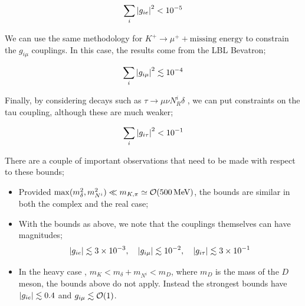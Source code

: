 \documentclass[10pt]{article}
\begin{document}
\begin{framed}
  \begin{equation}
    \sum_{i}{\left| g_{ie} \right|^2} < 10^{-5}
  \end{equation}
\end{framed}
\noindent We can use the same methodology for $K^+ \rightarrow \mu^+ + \text{missing energy}$ to constrain the $g_{i\mu}$ couplings. In this case, the results come from \cite{Artamonov2016} the LBL Bevatron;
\begin{framed}
  \begin{equation}
    \sum_{i}{\left| g_{i\mu} \right|^2} \lesssim 10^{-4}
  \end{equation}
\end{framed}
\noindent Finally, by considering decays such as $\tau \rightarrow \mu \nu N^i_R \delta$ \cite{Farzan2010}, we can put constraints on the tau coupling, although these are much weaker;
\begin{framed}
  \begin{equation}
    \sum_{i}{\left| g_{i\tau} \right|^2} < 10^{-1}
  \end{equation}
\end{framed}
\noindent There are a couple of important observations that need to be made with respect to these bounds;
\begin{itemize}
  \item Provided $\max(m_\delta^2, m_{N^i}^2) \ll m_{K, \pi} \simeq \mathcal{O}(500\,\text{MeV})$, the bounds are similar in both the complex and the real case;
  \item With the bounds as above, we note that the couplings themselves can have magnitudes;
  \begin{equation}
    \left| g_{ie} \right| \lesssim 3 \times 10^{-3}, \quad \left| g_{i\mu} \right| \lesssim 10^{-2}, \quad \left| g_{i\tau} \right| \lesssim 3 \times 10^{-1}
  \end{equation}
  \item In the heavy case \cite{Farzan2014}, $m_K < m_\delta + m_{N^i} < m_D$, where $m_D$ is the mass of the $D$ meson, the bounds above do not apply. Instead the strongest bounds have $\left| g_{ie} \right| \lesssim 0.4$ and $g_{i\mu} \lesssim \mathcal{O}(1)$.
\end{itemize}
\end{document}
